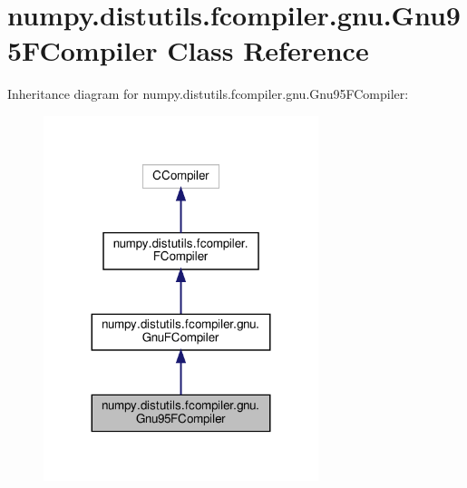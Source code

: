\hypertarget{classnumpy_1_1distutils_1_1fcompiler_1_1gnu_1_1Gnu95FCompiler}{}\section{numpy.\+distutils.\+fcompiler.\+gnu.\+Gnu95\+F\+Compiler Class Reference}
\label{classnumpy_1_1distutils_1_1fcompiler_1_1gnu_1_1Gnu95FCompiler}


Inheritance diagram for numpy.\+distutils.\+fcompiler.\+gnu.\+Gnu95\+F\+Compiler\+:
\nopagebreak
\begin{figure}[H]
\begin{center}
\leavevmode
\includegraphics[width=227pt]{classnumpy_1_1distutils_1_1fcompiler_1_1gnu_1_1Gnu95FCompiler__inherit__graph}
\end{center}
\end{figure}



